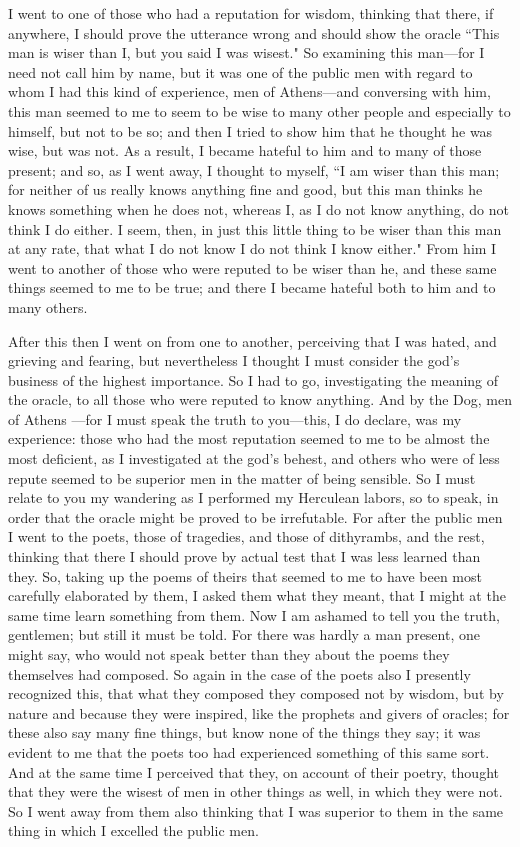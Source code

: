 \documentclass[letterpaper,12pt]{article}
\newcommand{\stephpag}[1]{\marginnote{\small\itshape\fontfamily{ppl}\selectfont #1}}
\begin{document}
I went to one of those who had a reputation for wisdom, \stephpag{c} thinking that there, if anywhere, I should prove the utterance wrong and should show the oracle ``This man is wiser than I, but you said I was wisest." So examining this man---for I need not call him by name, but it was one of the public men with regard to whom I had this kind of experience, men of Athens---and conversing with him, this man seemed to me to seem to be wise to many other people and especially to himself, but not to be so; and then I tried to show him that he thought \stephpag{d} he was wise, but was not. As a result, I became hateful to him and to many of those present; and so, as I went away, I thought to myself, ``I am wiser than this man; for neither of us really knows anything fine and good, but this man thinks he knows something when he does not, whereas I, as I do not know anything, do not think I do either. I seem, then, in just this little thing to be wiser than this man at any rate, that what I do not know I do not think I know either." From him I went to another of those who were reputed \stephpag{e} to be wiser than he, and these same things seemed to me to be true; and there I became hateful both to him and to many others.

After this then I went on from one to another, perceiving that I was hated, and grieving and fearing, but nevertheless I thought I must consider the god's business of the highest importance. So I had to go, investigating the meaning of the oracle, to all those who were reputed to know anything. And by the Dog, men of Athens\stephpag{22 a} ---for I must speak the truth to you---this, I do declare, was my experience: those who had the most reputation seemed to me to be almost the most deficient, as I investigated at the god's behest, and others who were of less repute seemed to be superior men in the matter of being sensible. So I must relate to you my wandering as I performed my Herculean labors, so to speak, in order that the oracle might be proved to be irrefutable. For after the public men I went to the poets, those of tragedies, and those of dithyrambs, \stephpag{b} and the rest, thinking that there I should prove by actual test that I was less learned than they. So, taking up the poems of theirs that seemed to me to have been most carefully elaborated by them, I asked them what they meant, that I might at the same time learn something from them. Now I am ashamed to tell you the truth, gentlemen; but still it must be told. For there was hardly a man present, one might say, who would not speak better than they about the poems they themselves had composed. So again in the case of the poets also I presently recognized this, \stephpag{c} that what they composed they composed not by wisdom, but by nature and because they were inspired, like the prophets and givers of oracles; for these also say many fine things, but know none of the things they say; it was evident to me that the poets too had experienced something of this same sort. And at the same time I perceived that they, on account of their poetry, thought that they were the wisest of men in other things as well, in which they were not. So I went away from them also thinking that I was superior to them in the same thing in which I excelled the public men.
\end{document}
